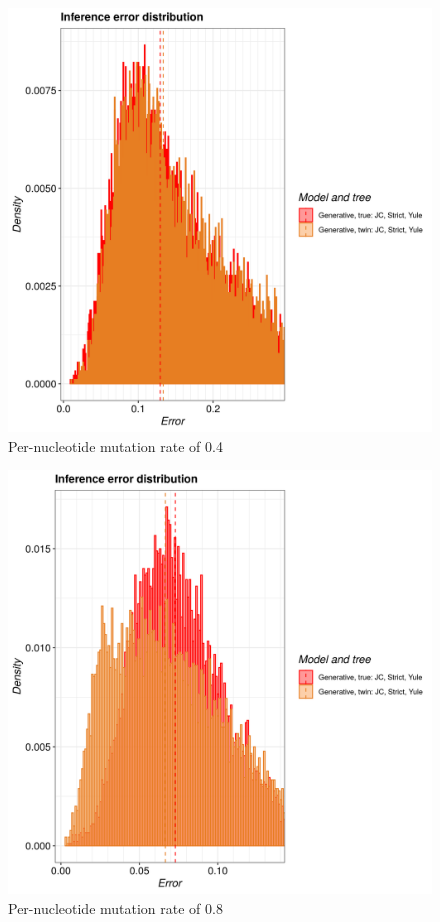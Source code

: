 \begin{figure}[H]
  \includegraphics[width=\textwidth]{pirouette_example_24/example_24_319/errors.png}
  \caption{Per-nucleotide mutation rate of 0.4}
\end{figure}

\begin{figure}[H]
  \includegraphics[width=\textwidth]{pirouette_example_24/example_24_320/errors.png}
  \caption{Per-nucleotide mutation rate of 0.8}
\end{figure}

